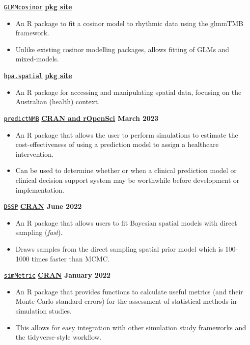 \texttt{\href{https://github.com/RWParsons/GLMMcosinor}{GLMMcosinor}} \hfill \textbf{\href{https://rwparsons.github.io/GLMMcosinor/}{pkg site}} \par
\begin{itemize}
    \item An R package to fit a cosinor model to rhythmic data using the glmmTMB framework. 
    \item Unlike existing cosinor modelling packages, allows fitting of GLMs and mixed-models.
\end{itemize}

\texttt{\href{https://github.com/healthpolicyanalysis/hpa.spatial}{hpa.spatial}} \hfill \textbf{\href{https://healthpolicyanalysis.github.io/hpa.spatial/}{pkg site}} \par
\begin{itemize}
    \item An R package for accessing and manipulating spatial data, focusing on the Australian (health) context.
\end{itemize}

\texttt{\href{https://github.com/ropensci/predictNMB}{predictNMB}} \hfill \textbf{\href{https://docs.ropensci.org/predictNMB/}{CRAN and rOpenSci} March 2023} \par
\begin{itemize}
    \item An R package that allows the user to perform simulations to estimate the cost-effectiveness of using a prediction model to assign a healthcare intervention.
    \item Can be used to determine whether or when a clinical prediction model or clinical decision support system may be worthwhile before development or implementation.
\end{itemize}

\texttt{\href{https://github.com/gentrywhite/DSSP}{DSSP}} \hfill \textbf{\href{https://cran.r-project.org/package=DSSP}{CRAN} June 2022} \par
\begin{itemize}
    \item An R package that allows users to fit Bayesian spatial models with direct sampling (\textit{fast}).
    \item Draws samples from the direct sampling spatial prior model which is 100-1000 times faster than MCMC.
\end{itemize}

\texttt{\href{https://github.com/RWParsons/simMetric}{simMetric}} \hfill \textbf{\href{https://cran.r-project.org/package=simMetric}{CRAN}  January 2022} \par
\begin{itemize}
    \item An R package that provides functions to calculate useful metrics (and their Monte Carlo standard errors) for the assessment of statistical methods in simulation studies.
    \item This allows for easy integration with other simulation study frameworks and the tidyverse-style workflow.
\end{itemize}

